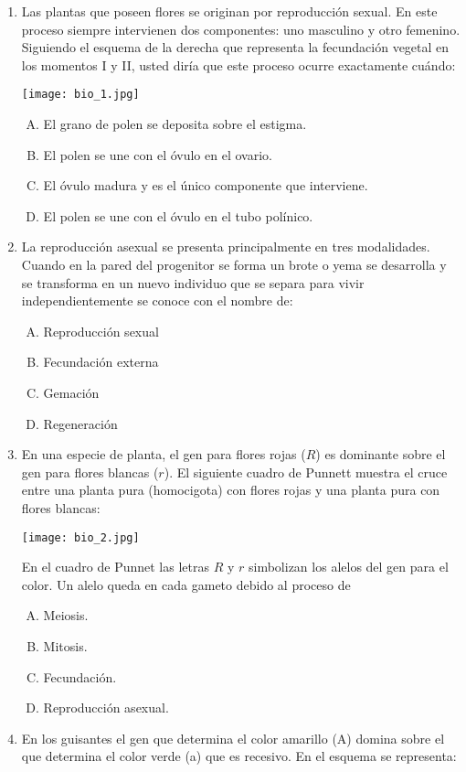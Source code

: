\begin{enumerate}



\item Las plantas que poseen flores se originan por reproducción  sexual. En este proceso siempre intervienen dos componentes: uno masculino y otro femenino. Siguiendo el esquema   de la derecha que representa la fecundación vegetal en los momentos I y II, usted diría que este proceso ocurre exactamente cuándo: \label{bio-2}
\begin{center}
\texttt{[image: bio\_1.jpg]} 
\end{center}
\begin{enumerate}[(A)]
\item El grano de polen se deposita sobre el estigma.
\item El polen se une con el óvulo en el ovario.
\item El óvulo madura y es el único componente que interviene.
\item El polen se une con el óvulo en el tubo polínico.
\end{enumerate}


\newpage
\item La reproducción asexual se presenta    principalmente en tres modalidades. Cuando en la pared del progenitor se forma un brote o yema se desarrolla y se transforma en un nuevo individuo que se separa para vivir independientemente se conoce con el nombre de: \label{bio-1}
\begin{enumerate}[(A)]
\item Reproducción sexual 
\item Fecundación externa 
\item Gemación 
\item Regeneración 
\end{enumerate}
\item En una especie de planta, el gen para flores rojas ($R$) es dominante sobre el gen para flores blancas ($r$). El siguiente cuadro de Punnett muestra el cruce entre una planta pura (homocigota) con flores rojas y una planta pura con flores blancas: \label{bio-3}\\[-1.1cm]
\begin{center}
\texttt{[image: bio\_2.jpg]} 
\end{center}
En el cuadro de Punnet las letras $R$ y $r$ simbolizan los alelos del gen para el color. Un alelo queda en cada gameto debido al proceso de 
\begin{enumerate}[(A)]
\item Meiosis.
\item Mitosis.
\item Fecundación.
\item Reproducción asexual.
\end{enumerate}
\item En los guisantes el gen que determina el color amarillo (A) domina sobre el que determina el color verde (a) que es recesivo. En el esquema  se representa: \label{bio-4}


\end{enumerate}
